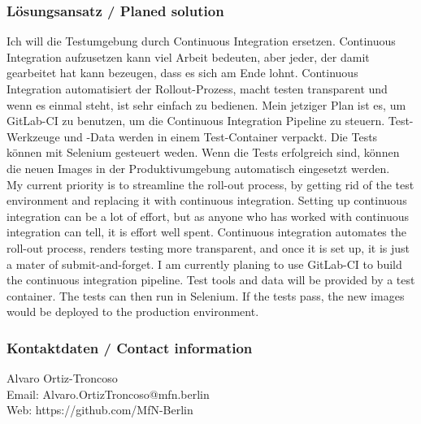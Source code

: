 {\scriptsize
\begin{frame}
  \frametitle{Lösungsansatz / \textcolor{mfn_green}{Planed solution}}
  Ich will die Testumgebung durch Continuous Integration ersetzen. Continuous Integration aufzusetzen kann viel Arbeit bedeuten, aber jeder, der damit gearbeitet hat kann bezeugen, dass es sich am Ende lohnt. Continuous Integration automatisiert der Rollout-Prozess, macht testen transparent und wenn es einmal steht, ist sehr einfach zu bedienen. Mein jetziger Plan ist es, um GitLab-CI zu benutzen, um die Continuous Integration Pipeline zu steuern. Test-Werkzeuge und -Data werden in einem Test-Container verpackt. Die Tests können mit Selenium gesteuert weden. Wenn die Tests erfolgreich sind, können die neuen Images in der Produktivumgebung automatisch eingesetzt werden.\\
  \bigskip
  \textcolor{mfn_green}{My current priority is to streamline the roll-out process, by getting rid of the test environment and replacing it with continuous integration. Setting up continuous integration can be a lot of effort, but as anyone who has worked with continuous integration can tell, it is effort well spent. Continuous integration automates the roll-out process, renders testing more transparent, and once it is set up, it is just a mater of submit-and-forget. I am currently planing to use GitLab-CI to build the continuous integration pipeline. Test tools and data will be provided by a test container. The tests can then run in Selenium. If the tests pass, the new images would be deployed to the production environment.}
\end{frame}
}
\begin{frame}
  \frametitle{Kontaktdaten / \textcolor{mfn_green}{Contact information}}
  \begin{center}
    Alvaro Ortiz-Troncoso \\
    \medskip
    Email: Alvaro.OrtizTroncoso@mfn.berlin \\    
    \medskip
    Web: https://github.com/MfN-Berlin
  \end{center}
\end{frame}




